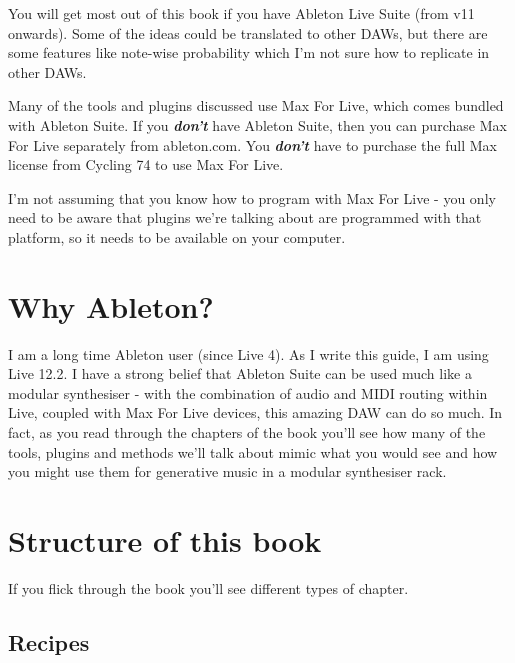 \documentclass[
  12pt,
  letterpaper,
  oneside,
  open=any]{scrbook}
\begin{document}
You will get most out of this book if you have Ableton Live Suite (from
v11 onwards). Some of the ideas could be translated to other DAWs, but
there are some features like note-wise probability which I'm not sure
how to replicate in other DAWs.

Many of the tools and plugins discussed use Max For Live, which comes
bundled with Ableton Suite. If you \textbf{\emph{don't}} have Ableton
Suite, then you can purchase Max For Live separately from ableton.com.
You \textbf{\emph{don't}} have to purchase the full Max license from
Cycling 74 to use Max For Live.

I'm not assuming that you know how to program with Max For Live - you
only need to be aware that plugins we're talking about are programmed
with that platform, so it needs to be available on your computer.

\section*{Why Ableton?}\label{why-ableton}


I am a long time Ableton user (since Live 4). As I write this guide, I
am using Live 12.2. I have a strong belief that Ableton Suite can be
used much like a modular synthesiser - with the combination of audio and
MIDI routing within Live, coupled with Max For Live devices, this
amazing DAW can do so much. In fact, as you read through the chapters of
the book you'll see how many of the tools, plugins and methods we'll
talk about mimic what you would see and how you might use them for
generative music in a modular synthesiser rack.

\section*{Structure of this book}\label{structure-of-this-book}


If you flick through the book you'll see different types of chapter.

\subsection*{Recipes}\label{recipes}
\end{document}
